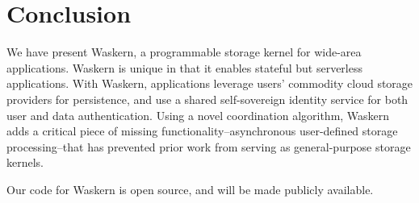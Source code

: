 \section{Conclusion}
\label{sec:conclusion}

We have present Waskern, a programmable storage kernel for wide-area
applications.  Waskern is unique in that it enables stateful but serverless
applications.  With Waskern, applications leverage users' commodity cloud storage providers for
persistence, and use a shared self-sovereign identity service for both user and
data authentication.  Using a novel coordination algorithm, Waskern adds a critical piece of
missing functionality--asynchronous user-defined storage processing--that has prevented prior work from
serving as general-purpose storage kernels.

Our code for Waskern is open source, and will be made publicly available.

